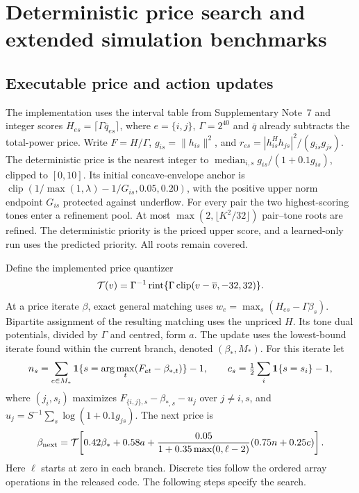 \documentclass[10pt,letterpaper]{article}
\begin{document}
\FloatBarrier

\section{Deterministic price search and extended simulation benchmarks}\label{supp:note4}

\subsection{Executable price and action updates}
The implementation uses the interval table from Supplementary Note~7 and integer
scores \(H_{es}=\lceil\Gamma\overline q_{es}\rceil\), where \(e=\{i,j\}\),
\(\Gamma=2^{40}\) and \(\overline q\) already subtracts the total-power price.
Write \(F=H/\Gamma\), \(g_{is}=\|h_{is}\|^2\), and
\(r_{es}=|h_{is}^{H}h_{js}|^2/(g_{is}g_{js})\).
The deterministic price is the nearest integer to
\(\operatorname{median}_{i,s}g_{is}/(1+0.1g_{is})\), clipped to \([0,10]\).
Its initial concave-envelope anchor is
\(\operatorname{clip}(1/\max(1,\lambda)-1/G_{is},0.05,0.20)\), with
the positive upper norm endpoint \(G_{is}\) protected against underflow.
For every pair the two highest-scoring tones enter a refinement pool.
At most \(\max(2,\lfloor K^2/32\rfloor)\) pair--tone roots are refined.
The deterministic priority is the priced upper score, and a learned-only run uses
the predicted priority. All roots remain covered.

Define the implemented price quantizer
\[
 {\cal T}(v)=\Gamma^{-1}\operatorname{rint}
 \{\Gamma\operatorname{clip}(v-\overline v,-32,32)\}.
\]
At a price iterate \(\beta\), exact general matching uses
\(w_e=\max_s(H_{es}-\Gamma\beta_s)\).
Bipartite assignment of the resulting matching uses the unpriced \(H\).
Its tone dual potentials, divided by \(\Gamma\) and centred, form \(a\).
The update uses the lowest-bound iterate found within the current branch,
denoted \((\beta_*,M_*)\). For this iterate let
\[
 n_s=\sum_{e\in M_*}{\bf1}
 \{s=\arg\max_t(F_{et}-\beta_{*,t})\}-1,\qquad
 c_s=\tfrac12\sum_i{\bf1}\{s=s_i\}-1 ,
\]
where \((j_i,s_i)\) maximizes \(F_{\{i,j\},s}-\beta_{*,s}-u_j\) over
\(j\ne i,s\), and \(u_j=S^{-1}\sum_s\log(1+0.1g_{js})\).
The next price is
\begin{equation}\label{supp:priceupdate}
 \beta_{\rm next}={\cal T}\!\left[
 0.42\beta_*+0.58a+
 \frac{0.05}{1+0.35\max(0,\ell-2)}
 (0.75n+0.25c)\right].
\end{equation}
Here \(\ell\) starts at zero in each branch. Discrete ties follow the ordered
array operations in the released code. The following steps specify the search.
\end{document}

